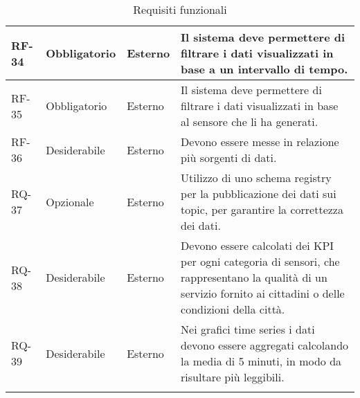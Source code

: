\begin{longtable}{|>{\centering\arraybackslash}m{}|>{\centering\arraybackslash}m{}|>{\centering\arraybackslash}m{}|>{\centering\arraybackslash}m{}|}
	RF-34           & Obbligatorio        & Esterno        & Il sistema deve permettere di filtrare i dati visualizzati in base a un intervallo di tempo.                                                                                                                                                                                                                                                                                     \\\hline
	RF-35           & Obbligatorio        & Esterno        & Il sistema deve permettere di filtrare i dati visualizzati in base al sensore che li ha generati.                                                                                                                                                                                                                                                                                \\\hline
	RF-36           & Desiderabile        & Esterno        & Devono essere messe in relazione più sorgenti di dati.                                                                                                                                                                                                                                                                                                                           \\\hline
	RQ-37           & Opzionale           & Esterno        & Utilizzo di uno schema registry per la pubblicazione dei dati sui topic, per garantire la correttezza dei dati.                                                                                                                                                                                                                                                                  \\\hline
	RQ-38           & Desiderabile        & Esterno        & Devono essere calcolati dei KPI per ogni categoria di sensori, che rappresentano la qualità di un servizio fornito ai cittadini o delle condizioni della città.                                                                                                                                                                                                                  \\\hline
	RQ-39           & Desiderabile        & Esterno        & Nei grafici time series i dati devono essere aggregati calcolando la media di 5 minuti, in modo da risultare più leggibili.                                                                                                                                                                                                                                                      \\\hline
	\caption{Requisiti funzionali}
	\label{table:1}
\end{longtable}

